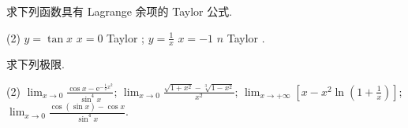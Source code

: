 \begin{exercise}[3.6.5]
    求下列函数具有 Lagrange 余项的 Taylor 公式.
    \begin{tasks}(2)
        \task $y = \tan x$  $x = 0$  Taylor ;
        \task $y = \frac{1}{x}$  $x = -1$  $n$  Taylor .
    \end{tasks}
\end{exercise}

\begin{exercise}[3.6.6]
    求下列极限.
    \begin{tasks}(2)
        \task $\displaystyle \lim_{x \to 0} \frac{\cos x - \mathrm{e}^{-\frac{1}{2}x^2}}{\sin^4 x}$;
        \task $\displaystyle \lim_{x \to 0} \frac{\sqrt{1 + x^2} - \sqrt[3]{1 - x^2}}{x^2}$;
        \task $\displaystyle \lim_{x \to +\infty} \left[x - x^2 \ln \left(1 + \frac{1}{x}\right)\right]$;
        \task $\displaystyle \lim_{x \to 0} \frac{\cos(\sin x) - \cos x}{\sin^4 x}$.
    \end{tasks}
\end{exercise}

